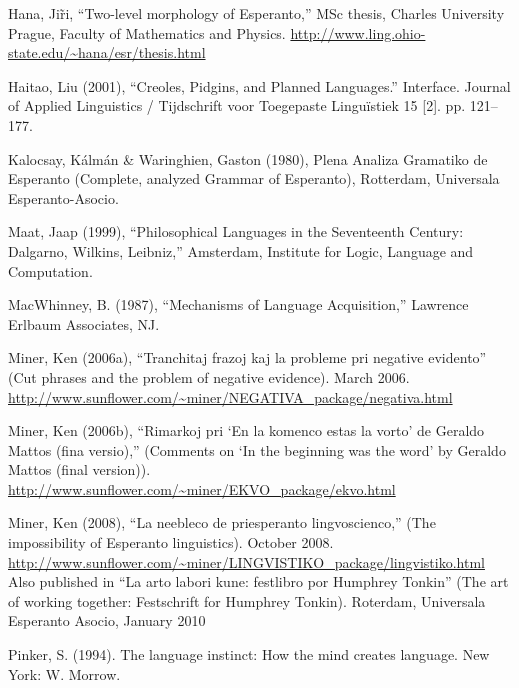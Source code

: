 \documentclass[10pt,a4paper]{article}
\begin{document}
\begin{description*}
\item[Hana,] Ji\~ri, ``Two-level morphology of Esperanto,'' MSc thesis, Charles
University Prague, Faculty of Mathematics and Physics.
\url{http://www.ling.ohio-state.edu/~hana/esr/thesis.html}

\item[Haitao,] Liu (2001), ``Creoles, Pidgins, and Planned Languages.'' Interface.
Journal of Applied Linguistics / Tijdschrift voor Toegepaste Linguïstiek 15 [2]. pp. 121--177.

\item[Kalocsay,] K\'alm\'an \& Waringhien, Gaston (1980), Plena Analiza Gramatiko de
Esperanto (Complete, analyzed Grammar of Esperanto), Rotterdam, Universala
Esperanto-Asocio.

\item[Maat,] Jaap (1999), ``Philosophical Languages in the Seventeenth Century:
Dalgarno, Wilkins, Leibniz,'' Amsterdam, Institute for Logic, Language and
Computation.

\item[MacWhinney,] B. (1987), ``Mechanisms of Language Acquisition,'' Lawrence Erlbaum Associates, NJ.

\item[Miner,] Ken (2006a), ``Tranchitaj frazoj kaj la probleme pri negative
evidento'' (Cut phrases and the problem of negative evidence). March 2006. \\
\url{http://www.sunflower.com/~miner/NEGATIVA_package/negativa.html}

\item[Miner,] Ken (2006b), ``Rimarkoj pri `En la komenco estas la vorto' de Geraldo
Mattos (fina versio),'' (Comments on `In the beginning was the word' by Geraldo
Mattos (final version)). \\
\url{http://www.sunflower.com/~miner/EKVO_package/ekvo.html}

\item[Miner,] Ken (2008), ``La neebleco de priesperanto lingvoscienco,'' (The
impossibility of Esperanto linguistics). October 2008. \\
\url{http://www.sunflower.com/~miner/LINGVISTIKO_package/lingvistiko.html} \\
Also published in ``La arto labori kune: festlibro por Humphrey Tonkin'' (The
art of working together: Festschrift for Humphrey Tonkin). Roterdam, Universala
Esperanto Asocio, January 2010

\item[Pinker,] S. (1994). The language instinct: How the mind creates language. New York: W. Morrow.


\end{description*}
\end{document}
